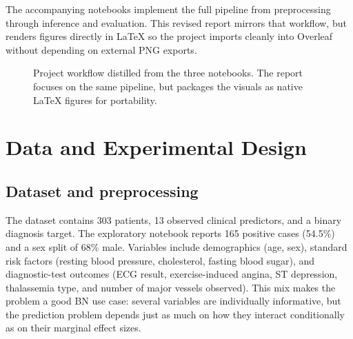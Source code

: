 \documentclass[10pt,twocolumn]{article}
\begin{document}
The accompanying notebooks implement the full pipeline from preprocessing through inference and evaluation. This revised report mirrors that workflow, but renders figures directly in \LaTeX{} so the project imports cleanly into Overleaf without depending on external PNG exports.

\begin{figure}[t]
\centering
{}
\caption{Project workflow distilled from the three notebooks. The report focuses on the same pipeline, but packages the visuals as native \LaTeX{} figures for portability.}
\label{fig:pipeline}
\end{figure}

\section{Data and Experimental Design}

\subsection{Dataset and preprocessing}
The dataset contains 303 patients, 13 observed clinical predictors, and a binary diagnosis target. The exploratory notebook reports 165 positive cases (54.5\%) and a sex split of 68\% male. Variables include demographics (age, sex), standard risk factors (resting blood pressure, cholesterol, fasting blood sugar), and diagnostic-test outcomes (ECG result, exercise-induced angina, ST depression, thalassemia type, and number of major vessels observed). This mix makes the problem a good BN use case: several variables are individually informative, but the prediction problem depends just as much on how they interact conditionally as on their marginal effect sizes.
\end{document}
